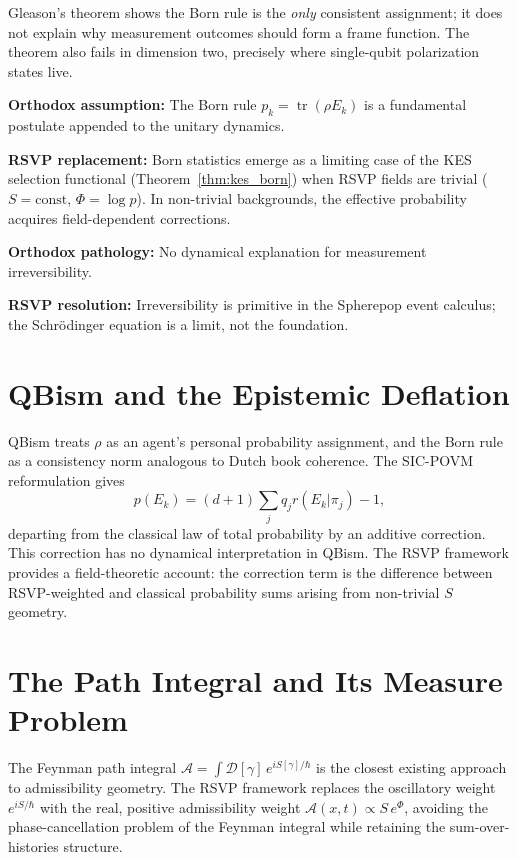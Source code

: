 \documentclass[11pt, openright, twoside]{book}
\theoremstyle{plain}
\theoremstyle{definition}
\theoremstyle{remark}
\newcommand{\Sfield}{S}
\newcommand{\Admiss}{\mathcal{A}}
\begin{document}
Gleason's theorem shows the Born rule is the \emph{only} consistent assignment; it does
not explain why measurement outcomes should form a frame function. The theorem also fails
in dimension two, precisely where single-qubit polarization states live.

\begin{compbox}
\textbf{Orthodox assumption:} The Born rule $p_k=\operatorname{tr}(\rho E_k)$ is a
fundamental postulate appended to the unitary dynamics.

\textbf{RSVP replacement:} Born statistics emerge as a limiting case of the KES selection
functional (Theorem~\ref{thm:kes_born}) when RSVP fields are trivial ($\Sfield=\mathrm{const}$,
$\Phi=\log p$). In non-trivial backgrounds, the effective probability acquires field-dependent
corrections.

\textbf{Orthodox pathology:} No dynamical explanation for measurement irreversibility.

\textbf{RSVP resolution:} Irreversibility is primitive in the Spherepop event calculus;
the Schr\"{o}dinger equation is a limit, not the foundation.
\end{compbox}

\section{QBism and the Epistemic Deflation}
\label{sec:qbism}

QBism treats $\rho$ as an agent's personal probability assignment, and the Born rule as a
consistency norm analogous to Dutch book coherence. The SIC-POVM reformulation gives
\begin{equation}
  p(E_k) = (d+1)\sum_j q_j r(E_k|\pi_j) - 1,
\end{equation}
departing from the classical law of total probability by an additive correction. This
correction has no dynamical interpretation in QBism. The RSVP framework provides a
field-theoretic account: the correction term is the difference between RSVP-weighted
and classical probability sums arising from non-trivial $\Sfield$ geometry.

\section{The Path Integral and Its Measure Problem}

The Feynman path integral $\mathcal{A} = \int\mathcal{D}[\gamma]\,e^{iS[\gamma]/\hbar}$
is the closest existing approach to admissibility geometry. The RSVP framework replaces
the oscillatory weight $e^{iS/\hbar}$ with the real, positive admissibility weight
$\Admiss(x,t)\propto\Sfield\,e^\Phi$, avoiding the phase-cancellation problem of
the Feynman integral while retaining the sum-over-histories structure.
\end{document}

